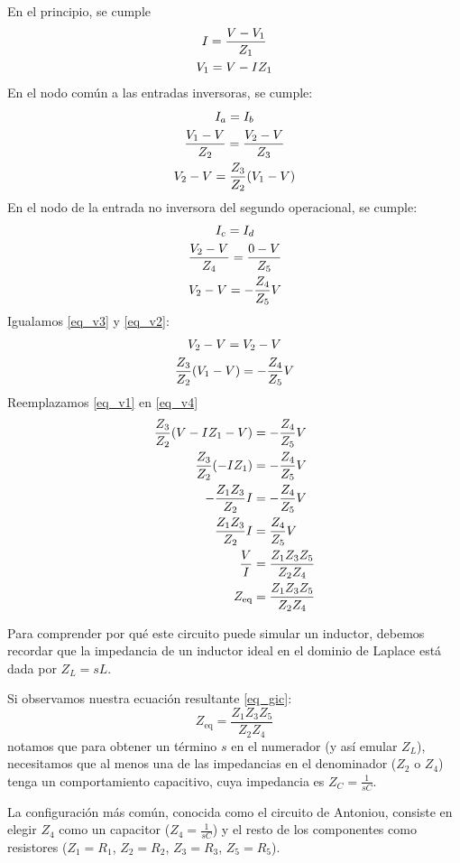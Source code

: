 En el principio, se cumple
\begin{gather}
  I=\frac{V-V_1}{Z_1} \notag\\ 
  V_1 = V - IZ_1 \label{eq_v1}
\end{gather}
En el nodo común a las entradas inversoras, se cumple:
\begin{gather}
  I_a=I_b \notag\\ 
  \frac{V_1-V}{Z_2} = \frac{V_2-V}{Z_3} \notag\\ 
  V_2 -V = \frac{Z_3}{Z_2}(V_1-V) \label{eq_v2}
\end{gather}
En el nodo de la entrada no inversora del segundo operacional, se cumple:
\begin{gather}
  I_c=I_d \notag\\ 
  \frac{V_2-V}{Z_4}=\frac{0-V}{Z_5} \notag\\ 
  V_2-V=-\frac{Z_4}{Z_5}V \label{eq_v3}
\end{gather}
Igualamos \eqref{eq_v3} y \eqref{eq_v2}:
\begin{gather}
  V_2-V=V_2-V \notag \\ 
  \frac{Z_3}{Z_2}(V_1-V)=-\frac{Z_4}{Z_5}V \label{eq_v4} 
\end{gather}
Reemplazamos \ref{eq_v1} en \ref{eq_v4}
\begin{align}
  \frac{Z_3}{Z_2}(V-IZ_1-V) &=-\frac{Z_4}{Z_5}V \notag\\ 
  \frac{Z_3}{Z_2}(-IZ_1) &=-\frac{Z_4}{Z_5}V \notag\\ 
  -\frac{Z_1Z_3}{Z_2}I &= -\frac{Z_4}{Z_5}V \notag\\ 
  \frac{Z_1Z_3}{Z_2}I &= \frac{Z_4}{Z_5}V \notag\\ 
  \frac{V}{I} &= \frac{Z_1Z_3Z_5}{Z_2Z_4} \notag\\ 
  Z_\text{eq} &= \frac{Z_1Z_3Z_5}{Z_2Z_4} \label{eq_gic}
\end{align}

Para comprender por qué este circuito puede simular un inductor, debemos recordar que la impedancia de un inductor ideal en el dominio de Laplace está dada por \(Z_L = sL\).

Si observamos nuestra ecuación resultante \eqref{eq_gic}:
\[
  Z_\text{eq} = \frac{Z_1Z_3Z_5}{Z_2Z_4}
\]
notamos que para obtener un término \(s\) en el numerador (y así emular \(Z_L\)), necesitamos que al menos una de las impedancias en el denominador (\(Z_2\) o \(Z_4\)) tenga un comportamiento capacitivo, cuya impedancia es \(Z_C = \frac{1}{sC}\). 

La configuración más común, conocida como el circuito de Antoniou, consiste en elegir \(Z_4\) como un capacitor (\(Z_4 = \frac{1}{sC}\)) y el resto de los componentes como resistores (\(Z_1 = R_1\), \(Z_2 = R_2\), \(Z_3 = R_3\), \(Z_5 = R_5\)). 

